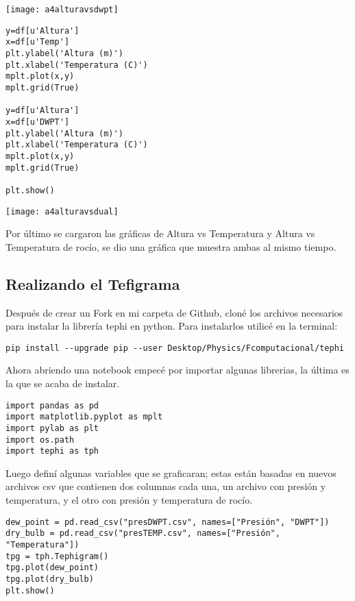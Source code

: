 \documentclass[12pt,a4paper]{article}
\begin{document}
\begin{center}
\texttt{[image: a4alturavsdwpt]}
\end{center}

\begin{verbatim}
y=df[u'Altura']
x=df[u'Temp']
plt.ylabel('Altura (m)')
plt.xlabel('Temperatura (C)')
mplt.plot(x,y)
mplt.grid(True)

y=df[u'Altura']
x=df[u'DWPT']
plt.ylabel('Altura (m)')
plt.xlabel('Temperatura (C)')
mplt.plot(x,y)
mplt.grid(True)

plt.show()
\end{verbatim}

\begin{center}
\texttt{[image: a4alturavsdual]}
\end{center}

Por último se cargaron las gráficas de Altura vs Temperatura y Altura vs Temperatura de rocío, se dio una gráfica que muestra ambas al mismo tiempo.

\newpage

\subsection{Realizando el Tefigrama}

Después de crear un Fork en mi carpeta de Github, cloné los archivos necesarios para instalar la librería tephi en python. Para instalarlos utilicé en la terminal:

\begin{verbatim}
pip install --upgrade pip --user Desktop/Physics/Fcomputacional/tephi
\end{verbatim}

Ahora abriendo una notebook empecé por importar algunas librerias, la última es la que se acaba de instalar.

\begin{verbatim}
import pandas as pd
import matplotlib.pyplot as mplt
import pylab as plt
import os.path
import tephi as tph
\end{verbatim}

Luego definí algunas variables que se graficaran; estas están basadas en nuevos archivos csv que contienen dos columnas cada una, un archivo con presión y temperatura, y el otro con presión y temperatura de rocío.

\begin{verbatim}
dew_point = pd.read_csv("presDWPT.csv", names=["Presión", "DWPT"])
dry_bulb = pd.read_csv("presTEMP.csv", names=["Presión", "Temperatura"])
tpg = tph.Tephigram()
tpg.plot(dew_point)
tpg.plot(dry_bulb)
plt.show()
\end{verbatim}
\end{document}
